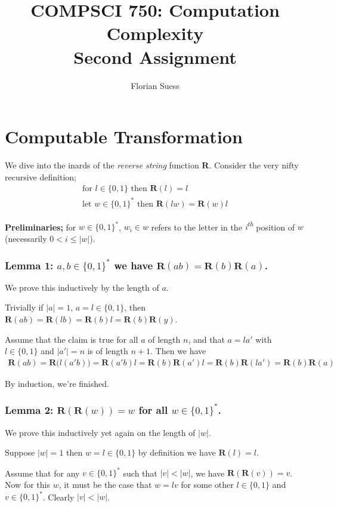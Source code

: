 \documentclass{article}
\title{COMPSCI 750: Computation Complexity \\ Second Assignment}
\author{Florian Suess}
\begin{document}
\maketitle

\section*{Computable Transformation}
We dive into the inards of the \emph{reverse string} function $\bm{R}$. Consider the very nifty recursive definition;
\begin{align*}
	\text{for } l \in \{0,1\} \text{ then } \bm{R}(l) = l \\
	\text{let } w \in \{0,1\}^* \text{ then } \bm{R}(lw) = \bm{R}(w)l
\end{align*}

\textbf{Preliminaries;} for $w \in \{0,1\}^*$, $w_i \in w$ refers to the letter in the \emph{i\textsuperscript{th}} position of $w$ (necessarily $0 < i \leq |w|$).

\subsubsection*{Lemma 1: $a,b \in \{0,1\}^*$ we have $\bm{R}(ab) = \bm{R}(b)\bm{R}(a)$.}
We prove this inductively by the length of $a$.

Trivially if $|a|=1$, $a=l\in \{0,1\}$, then $\bm{R}(ab)=\bm{R}(lb)=\bm{R}(b)l=\bm{R}(b)\bm{R}(y)$.

Assume that the claim is true for all $a$ of length $n$, and that $a=la'$ with $l\in \{0,1\}$ and $|a'|=n$ is of length $n+1$. Then we have
\begin{align*}
	\bm{R}(ab)=\bm{R}\bigl(l(a'b)\bigr)=\bm{R}(a'b)l=\bm{R}(b)\bm{R}(a')l=\bm{R}(b)\bm{R}(la')=\bm{R}(b)\bm{R}(a)
\end{align*}

By induction, we're finished.

\subsubsection*{Lemma 2: $\bm{R}(\bm{R}(w)) = w$ for all $w \in \{0,1\}^*$.}
We prove this inductively yet again on the length of $|w|$.

Suppose $|w| = 1$ then $w = l \in \{0,1\}$ by definition we have $\bm{R}(l) = l$.

Assume that for any $v \in \{0,1\}^*$ such that $|v| < |w|$, we have $\bm{R}(\bm{R}(v)) = v$. Now for this $w$, it must be the case that $w = lv$ for some other $l \in \{0,1\}$ and $v \in \{0,1\}^*$. Clearly $|v| < |w|$.
\end{document}
